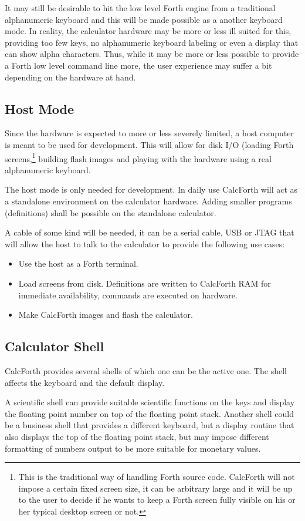 \documentclass[a4paper]{article}
\begin{document}
It may still be desirable to hit the low level Forth engine from a traditional alphanumeric keyboard and this will be made possible as a another keyboard mode. In reality, the calculator hardware may be more or less ill suited for this, providing too few keys, no alphanumeric keyboard labeling or even a display that can show alpha characters. Thus, while it may be more or less possible to provide a Forth low level command line more, the user experience may suffer a bit depending on the hardware at hand.

\subsection{Host Mode}
Since the hardware is expected to more or less severely limited, a host computer is meant to be used for development. This will allow for disk I/O (loading Forth screens,\footnote{This is the traditional way of handling Forth source code. CalcForth will not impose a certain fixed screen size, it can be arbitrary large and it will be up to the user to decide if he wants to keep a Forth screen fully visible on his or her typical desktop screen or not.} building flash images and playing with the hardware using a real alphanumeric keyboard.

The host mode is only needed for development. In daily use CalcForth will act as a standalone environment on the calculator hardware. Adding smaller programs (definitions) shall be possible on the standalone calculator.

A cable of some kind will be needed, it can be a serial cable, USB or JTAG that will allow the host to talk to the calculator to provide the following use cases:
\begin{itemize}
\item Use the host as a Forth terminal.
\item Load screens from disk. Definitions are written to CalcForth RAM for immediate availability, commands are executed on hardware.
\item Make CalcForth images and flash the calculator.
\end{itemize}

\subsection{Calculator Shell}
CalcForth provides several shells of which one can be the active one. The shell affects the keyboard and the default display.

A scientific shell can provide suitable scientific functions on the keys and display the floating point number on top of the floating point stack. Another shell could be a business shell that provides a different keyboard, but a display routine that also displays the top of the floating point stack, but may impose different formatting of numbers output to be more suitable for monetary values.
\end{document}
